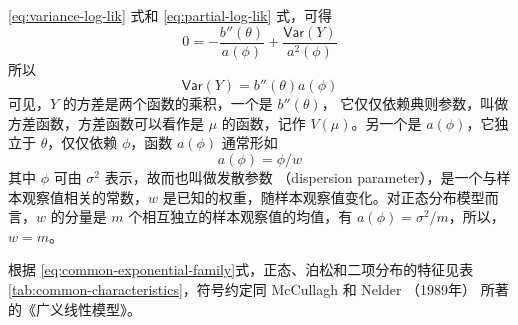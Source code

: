 \documentclass[12pt,a4paper,UTF8,twoside]{book}
\theoremstyle{definition}
\theoremstyle{definition}
\theoremstyle{definition}
\theoremstyle{remark}
\begin{document}
\eqref{eq:variance-log-lik} 式和 \eqref{eq:partial-log-lik} 式，可得
\[ 0 = - \frac{b''(\theta)}{a(\phi)} + \frac{\mathsf{Var}(Y)}{a^2(\phi)} \]
\noindent 所以 \[ \mathsf{Var}(Y) = b''(\theta)a(\phi) \] 可见，\(Y\)
的方差是两个函数的乘积，一个是 \(b''(\theta)\)，
它仅仅依赖典则参数，叫做方差函数，方差函数可以看作是 \(\mu\)
的函数，记作 \(V(\mu)\)。另一个是 \(a(\phi)\)，它独立于
\(\theta\)，仅仅依赖 \(\phi\)，函数 \(a(\phi)\) 通常形如
\[ a(\phi) = \phi/w \] \noindent 其中 \(\phi\) 可由 \(\sigma^2\)
表示，故而也叫做发散参数 （dispersion
parameter），是一个与样本观察值相关的常数，\(w\)
是已知的权重，随样本观察值变化。对正态分布模型而言，\(w\) 的分量是 \(m\)
个相互独立的样本观察值的均值，有
\(a(\phi) = \sigma^2/m\)，所以，\(w = m\)。

根据
\eqref{eq:common-exponential-family}式，正态、泊松和二项分布的特征见表
\ref{tab:common-characteristics}，符号约定同 McCullagh 和 Nelder
（1989年） 所著的《广义线性模型》。
\end{document}
